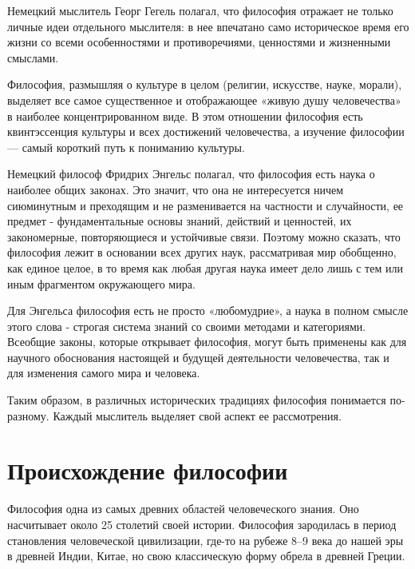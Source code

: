 \documentclass[
]{article}
\begin{document}
Немецкий мыслитель Георг Гегель полагал, что философия отражает не
только личные идеи отдельного мыслителя: в нее впечатано само
историческое время его жизни со всеми особенностями и противоречиями,
ценностями и жизненными смыслами.

Философия, размышляя о культуре в целом (религии, искусстве, науке,
морали), выделяет все самое существенное и отображающее «живую душу
человечества» в наиболее концентрированном виде. В этом отношении
философия есть квинтэссенция культуры и всех достижений человечества, а
изучение философии --- самый короткий путь к пониманию культуры.

Немецкий философ Фридрих Энгельс полагал, что философия есть наука о
наиболее общих законах. Это значит, что она не интересуется ничем
сиюминутным и преходящим и не разменивается на частности и случайности,
ее предмет - фундаментальные основы знаний, действий и ценностей, их
закономерные, повторяющиеся и устойчивые связи. Поэтому можно сказать,
что философия лежит в основании всех других наук, рассматривая мир
обобщенно, как единое целое, в то время как любая другая наука имеет
дело лишь с тем или иным фрагментом окружающего мира.

Для Энгельса философия есть не просто «любомудрие», а наука в полном
смысле этого слова - строгая система знаний со своими методами и
категориями. Всеобщие законы, которые открывает философия, могут быть
применены как для научного обоснования настоящей и будущей деятельности
человечества, так и для изменения самого мира и человека.

Таким образом, в различных исторических традициях философия понимается
по-разному. Каждый мыслитель выделяет свой аспект ее рассмотрения.

\hypertarget{ux43fux440ux43eux438ux441ux445ux43eux436ux434ux435ux43dux438ux435-ux444ux438ux43bux43eux441ux43eux444ux438ux438}{%
\section{Происхождение
философии}\label{ux43fux440ux43eux438ux441ux445ux43eux436ux434ux435ux43dux438ux435-ux444ux438ux43bux43eux441ux43eux444ux438ux438}}

Философия одна из самых древних областей человеческого знания. Оно
насчитывает около 25 столетий своей истории. Философия зародилась в
период становления человеческой цивилизации, где-то на рубеже 8--9 века
до нашей эры в древней Индии, Китае, но свою классическую форму обрела в
древней Греции.
\end{document}
